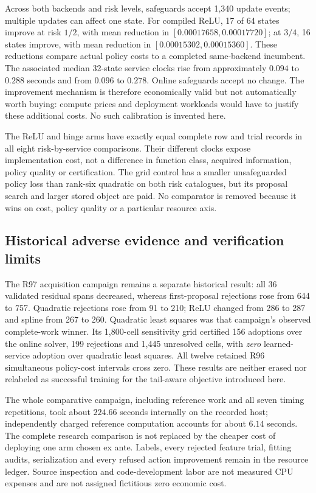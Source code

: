 Across both backends and risk levels, safeguards accept 1,340 update events; multiple updates can affect one state. For compiled ReLU, 17 of 64 states improve at risk $1/2$, with mean reduction in $[0.00017658,0.00017720]$; at $3/4$, 16 states improve, with mean reduction in $[0.00015302,0.00015360]$. These reductions compare actual policy costs to a completed same-backend incumbent. The associated median 32-state service clocks rise from approximately $0.094$ to $0.288$ seconds and from $0.096$ to $0.278$. Online safeguards accept no change. The improvement mechanism is therefore economically valid but not automatically worth buying: compute prices and deployment workloads would have to justify these additional costs. No such calibration is invented here.

The ReLU and hinge arms have exactly equal complete row and trial records in all eight risk-by-service comparisons. Their different clocks expose implementation cost, not a difference in function class, acquired information, policy quality or certification. The grid control has a smaller unsafeguarded policy loss than rank-six quadratic on both risk catalogues, but its proposal search and larger stored object are paid. No comparator is removed because it wins on cost, policy quality or a particular resource axis.

\subsection{Historical adverse evidence and verification limits}
The R97 acquisition campaign remains a separate historical result: all 36 validated residual spans decreased, whereas first-proposal rejections rose from 644 to 757. Quadratic rejections rose from 91 to 210; ReLU changed from 286 to 287 and spline from 267 to 260. Quadratic least squares was that campaign's observed complete-work winner. Its 1,800-cell sensitivity grid certified 156 adoptions over the online solver, 199 rejections and 1,445 unresolved cells, with \emph{zero} learned-service adoption over quadratic least squares. All twelve retained R96 simultaneous policy-cost intervals cross zero. These results are neither erased nor relabeled as successful training for the tail-aware objective introduced here.

The whole comparative campaign, including reference work and all seven timing repetitions, took about $224.66$ seconds internally on the recorded host; independently charged reference computation accounts for about $6.14$ seconds. The complete research comparison is not replaced by the cheaper cost of deploying one arm chosen ex ante. Labels, every rejected feature trial, fitting audits, serialization and every refused action improvement remain in the resource ledger. Source inspection and code-development labor are not measured CPU expenses and are not assigned fictitious zero economic cost.

